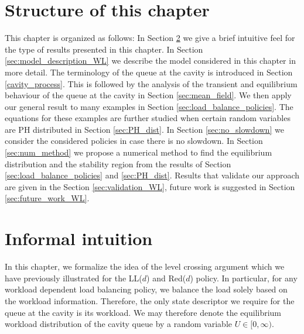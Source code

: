 \documentclass[12pt]{report}
\begin{document}
\section{Structure of this chapter}
This chapter is organized as follows: In Section \ref{sec:intuition_WL_dependent} we give a brief intuitive feel for the type of results presented in this chapter. In Section \ref{sec:model_description_WL} we describe the model considered in this chapter in more detail. The terminology of the queue at the cavity is introduced in Section \ref{cavity_process}. This is followed by the analysis of the transient and equilibrium behaviour of the queue at the cavity in Section \ref{sec:mean_field}. We then apply our general result to many examples in Section \ref{sec:load_balance_policies}. The equations for these examples are further studied when certain random variables are PH distributed in Section \ref{sec:PH_dist}. In Section \ref{sec:no_slowdown} we consider the considered policies in case there is no slowdown. In Section \ref{sec:num_method} we propose a numerical method to find the equilibrium distribution and the stability region from the results of Section \ref{sec:load_balance_policies} and \ref{sec:PH_dist}. Results that validate our
approach are given in the Section \ref{sec:validation_WL}, future work is suggested in Section \ref{sec:future_work_WL}.

\section{Informal intuition} \label{sec:intuition_WL_dependent}
In this chapter, we formalize the idea of the level crossing argument which we have previously illustrated for the LL($d$) and Red($d$) policy. In particular, for any workload dependent load balancing policy, we balance the load solely based on the workload information. Therefore, the only state descriptor we require for the queue at the cavity is its workload. We may therefore denote the equilibrium workload distribution of the cavity queue by a random variable $U \in [0,\infty)$.
\end{document}
